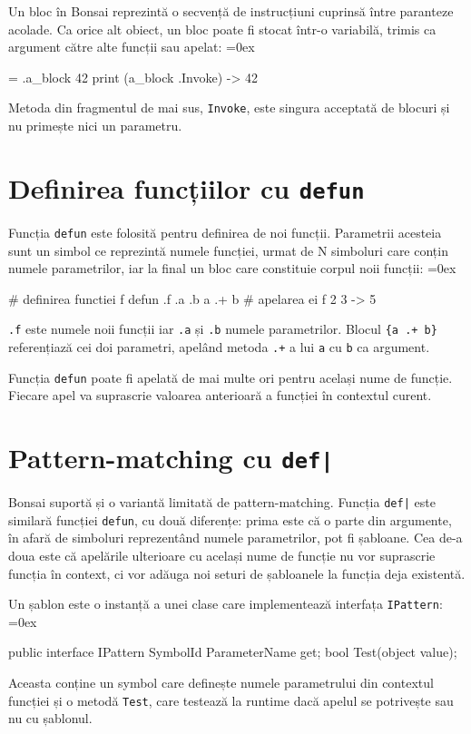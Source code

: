 \documentclass[12pt,a4paper]{memoir}
\renewcommand{\c}{\texttt}
\newenvironment{code}
{
\definecolor{shadecolor}{gray}{0.91}
\topsep=0ex
\relax
\shaded
\verbatim
}
{
\endverbatim
\endshaded
}
\begin{document}
Un bloc în Bonsai reprezintă o secvență de instrucțiuni cuprinsă între paranteze acolade. Ca orice alt obiect, un bloc poate fi stocat într-o variabilă, trimis ca argument către alte funcții sau apelat:
\begin{code}
= .a_block { 42 }
print (a_block .Invoke)
  -> 42
\end{code}
Metoda din fragmentul de mai sus, \c{Invoke}, este singura acceptată de blocuri și nu primește nici un parametru. 

\section{Definirea funcțiilor cu \c{defun}}\label{sec:defun}

Funcția \c{defun} este folosită pentru definirea de noi funcții. Parametrii acesteia sunt un simbol ce reprezintă numele funcției, urmat de N simboluri care conțin numele parametrilor, iar la final un bloc care constituie corpul noii funcții:
\begin{code}
\# definirea functiei f
defun .f .a .b {
  a .+ b 
}
\# apelarea ei
f 2 3
  -> 5
\end{code}
\c{.f} este numele noii funcții iar \c{.a} și \c{.b} numele parametrilor. Blocul \c{\{a .+ b\}} referențiază cei doi parametri, apelând metoda \c{.+} a lui \c{a} cu \c{b} ca argument.

Funcția \c{defun} poate fi apelată de mai multe ori pentru același nume de funcție. Fiecare apel va suprascrie valoarea anterioară a funcției în contextul curent.

\section{Pattern-matching cu \c{def|}}

Bonsai suportă și o variantă limitată de pattern-matching. Funcția \c{def|} este similară funcției \c{defun}, cu două diferențe:
prima este că o parte din argumente, în afară de simboluri reprezentând numele parametrilor, pot fi șabloane. Cea de-a doua este că apelările ulterioare cu același nume de funcție nu vor suprascrie funcția în context, ci vor adăuga noi seturi de șabloanele la funcția deja existentă.

Un șablon este o instanță a unei clase care implementează interfața \c{IPattern}:
\begin{code}
public interface IPattern {
  SymbolId ParameterName { get; }
  bool Test(object value);
}
\end{code}
Aceasta conține un symbol care definește numele parametrului din contextul funcției și o metodă \c{Test}, care testează la runtime dacă apelul se potrivește sau nu cu șablonul.
\end{document}
